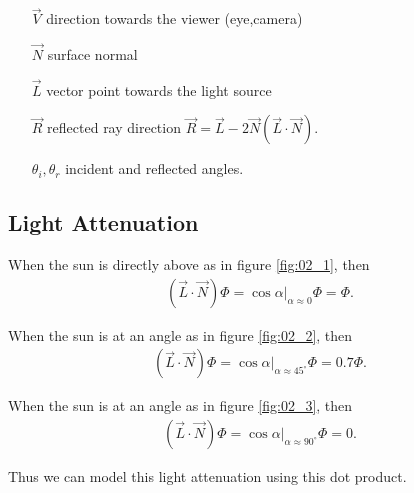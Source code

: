 \documentclass[../pbr.tex]{subfile}
\begin{document}
\begin{enumerate}
  \item[$\vec{V}$] direction towards the viewer (eye,camera)
  \item[$\vec{N}$] surface normal
  \item[$\vec{L}$] vector point towards the light source
  \item[$\vec{R}$] reflected ray direction
    $\vec{R}=\vec{L}-2\vec{N}\left(\vec{L}\cdot\vec{N}\right)$.
  \item[$\theta_i,\theta_r$] incident and reflected angles.
\end{enumerate}

\subsection{Light Attenuation}%
\label{sub:light_attenuation}

When the sun is directly above as in figure \ref{fig:02_1}, then
\begin{align*}
  \left(\vec{L}\cdot\vec{N}\right)\Phi=\cos\alpha|_{\alpha\approx0}\Phi=\Phi.
\end{align*}

\begin{Figure}
  \begin{center}
    
  \end{center}
  \label{fig:02_2}
\end{Figure}

When the sun is at an angle as in figure \ref{fig:02_2}, then
\begin{align*}
  \left(\vec{L}\cdot\vec{N}\right)\Phi=\cos\alpha|_{\alpha\approx45^\circ}\Phi=0.7\Phi.
\end{align*}

\begin{Figure}
  \begin{center}
    
  \end{center}
  \label{fig:02_3}
\end{Figure}

When the sun is at an angle as in figure \ref{fig:02_3}, then
\begin{align*}
  \left(\vec{L}\cdot\vec{N}\right)\Phi=\cos\alpha|_{\alpha\approx90^\circ}\Phi=0.
\end{align*}

Thus we can model this light attenuation using this dot product.
\end{document}
